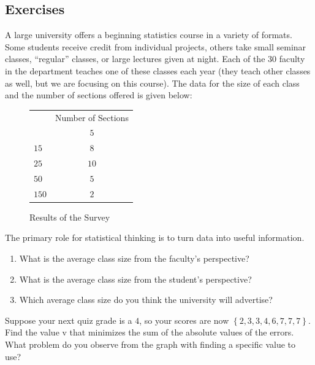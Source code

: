 \documentclass[10pt,]{book}
\theoremstyle{ptxdefinitionnotitle}
\theoremstyle{ptxdefinitiontitle}
\numberwithin{equation}{section}
\newcommand{\hrulemedium}{\noalign{\hrule height 0.07em}}
\begin{document}
\subsection*{Exercises}\hypertarget{exercises-2}{}
\begin{divisionexercise}{1}\hypertarget{exercise-4}{}
\hypertarget{p-75}{}%
A large university offers a beginning statistics course in a variety of formats. Some students receive credit from individual projects, others take small seminar classes, ``regular'' classes, or large lectures given at night. Each of the 30 faculty in the department teaches one of these classes each year (they teach other classes as well, but we are focusing on this course). The data for the size of each class and the number of sections offered is given below: \begin{figure}
\centering
\begin{tabular}{cc}\hrulemedium
\multicolumn{1}{l}{Class Size}&\multicolumn{1}{l}{Number of Sections}\tabularnewline\hrulemedium
\multicolumn{1}{l}{\(1\)}&\(5\)\tabularnewline[0pt]
\multicolumn{1}{l}{\(15\)}&\(8\)\tabularnewline[0pt]
\multicolumn{1}{l}{\(25\)}&\(10\)\tabularnewline[0pt]
\multicolumn{1}{l}{\(50\)}&\(5\)\tabularnewline[0pt]
\multicolumn{1}{l}{\(150\)}&\(2\)
\end{tabular}
\caption{Results of the Survey\label{class-size}}
\end{figure}
 \noindent The primary role for statistical thinking is to turn data into useful information. \\ \leavevmode%
\begin{enumerate}[label=(\alph*)]
\item\hypertarget{li-1}{}What is the average class size from the faculty’s perspective?%
\item\hypertarget{li-2}{}What is the average class size from the student’s perspective?%
\item\hypertarget{li-3}{}Which average class size do you think the university will advertise? \\%
\end{enumerate}
%
\end{divisionexercise}%
\begin{divisionexercise}{2}\hypertarget{exercise-5}{}
\hypertarget{p-76}{}%
Suppose your next quiz grade is a \(4\), so your scores are now \(\left\{ {2,3,3,4,6,7,7,7} \right\}\). Find the value v that minimizes the sum of the absolute values of the errors. What problem do you observe from the graph with finding a specific value to use? \\%
\end{divisionexercise}%
\end{document}
